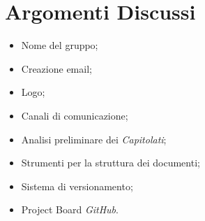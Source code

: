
\section{Argomenti Discussi}
	\begin{itemize}
		\item Nome del gruppo;
		\item Creazione email;
		\item Logo;
		\item Canali di comunicazione;
		\item Analisi preliminare dei \textit{Capitolati\glos};
		\item Strumenti per la struttura dei documenti;
		\item Sistema di versionamento;
		\item Project Board \textit{GitHub\glos}.
	\end{itemize}
